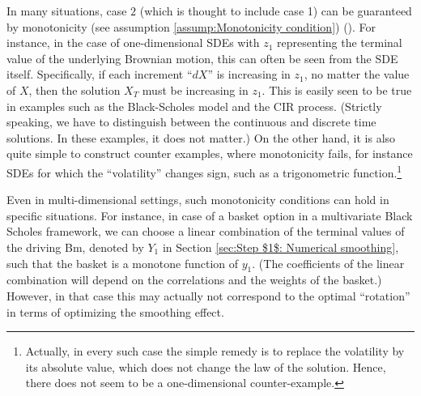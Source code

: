 In many situations, case $2$ (which is thought to include case 1) can be
guaranteed by monotonicity (see assumption  \eqref{assump:Monotonicity condition}) (). For instance, in the case of one-dimensional SDEs
with $z_1$ representing the terminal value of the underlying Brownian motion, this can often be seen from the SDE itself. Specifically, if each increment ``$dX$'' is increasing in $z_1$, no matter the value of $X$, then the solution $X_T$ must be increasing
in $z_1$. This is easily seen to be true in examples such as the Black-Scholes model and the CIR process. (Strictly speaking, we have to distinguish between the continuous and discrete time solutions. In these examples, it does not matter.) On the other hand, it is also quite simple to construct counter examples, where monotonicity fails, for instance SDEs for which the ``volatility'' changes sign, such as a trigonometric function.\footnote{Actually, in every such case the simple remedy is to replace the volatility by its absolute value, which does not change the law of the solution. Hence, there does not seem to be a one-dimensional counter-example.}

Even in multi-dimensional settings, such monotonicity conditions can hold in specific situations. For instance, in case of a basket option in a multivariate Black Scholes framework, we can choose a linear combination of the terminal values of the driving Bm, denoted by $Y_1$ in Section \ref{sec:Step $1$: Numerical smoothing}, such that the basket is a monotone function of $y_1$. (The coefficients of the linear combination will depend on the correlations and the weights of the basket.) However, in that case this may actually not correspond to the optimal ``rotation'' in terms of optimizing the smoothing effect.

